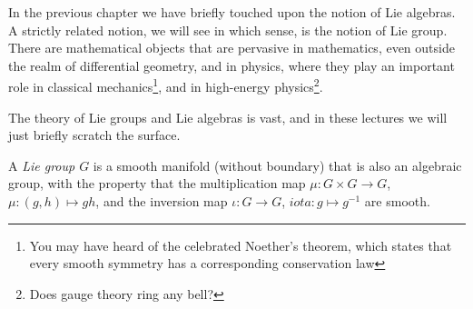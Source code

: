 In the previous chapter we have briefly touched upon the notion of Lie algebras.
A strictly related notion, we will see in which sense, is the notion of Lie group.
There are mathematical objects that are pervasive in mathematics, even outside the realm of differential geometry, and in physics, where they play an important role in classical mechanics\footnote{You may have heard of the celebrated Noether's theorem, which states that every smooth symmetry has a corresponding conservation law}, and in high-energy physics\footnote{Does gauge theory ring any bell?}.

The theory of Lie groups and Lie algebras is vast, and in these lectures we will just briefly scratch the surface.

\begin{definition}
  A \emph{Lie group $G$} is a smooth manifold (without boundary) that is also an algebraic group, with the property that the multiplication map $\mu: G\times G \to G$, $\mu:(g,h)\mapsto gh$, and the inversion map $\iota:G\to G$, $iota: g\mapsto g^{-1}$ are smooth.
\end{definition}

